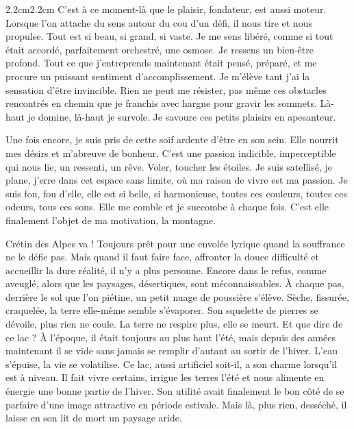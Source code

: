 \begin{adjustwidth}{2.2cm}{2.2cm}
C’est à ce moment-là que le plaisir, fondateur, est aussi moteur. Lorsque l’on attache du sens autour du cou d’un défi, il nous tire et nous propulse. Tout est si beau, si grand, si vaste. Je me sens libéré, comme si tout était accordé, parfaitement orchestré, une osmose. Je ressens un bien-être profond. Tout ce que j’entreprends maintenant était pensé, préparé, et me procure un puissant sentiment d’accomplissement. Je m’élève tant j’ai la sensation d’être invincible. Rien ne peut me résister, pas même ces obstacles rencontrés en chemin que je franchis avec hargne pour gravir les sommets. Là-haut je domine, là-haut je survole. Je savoure ces petits plaisirs en apesanteur.

Une fois encore, je suis pris de cette soif ardente d’être en son sein. Elle nourrit mes désirs et m’abreuve de bonheur. C’est une passion indicible, imperceptible qui nous lie, un ressenti, un rêve. Voler, toucher les étoiles. Je suis satellisé, je plane, j’erre dans cet espace sans limite, où ma raison de vivre est ma passion. Je suis fou, fou d’elle, elle est si belle, si harmonieuse, toutes ces couleurs, toutes ces odeurs, tous ces sons. Elle me comble et je succombe à chaque fois. C’est elle finalement l’objet de ma motivation, la montagne.

Crétin des Alpes va ! Toujours prêt pour une envolée lyrique quand la souffrance ne le défie pas. Mais quand il faut faire face, affronter la douce difficulté et accueillir la dure réalité, il n’y a plus personne. Encore dans le refus, comme aveuglé, alors que les paysages, désertiques, sont méconnaissables. À chaque pas, derrière le sol que l’on piétine, un petit nuage de poussière s’élève. Sèche, fissurée, craquelée, la terre elle-même semble s’évaporer. Son squelette de pierres se dévoile, plus rien ne coule. La terre ne respire plus, elle se meurt. Et que dire de ce lac ? À l’époque, il était toujours au plus haut l’été, mais depuis des années maintenant il se vide sans jamais se remplir d’autant au sortir de l’hiver. L’eau s’épuise, la vie se volatilise. Ce lac, aussi artificiel soit-il, a son charme lorsqu’il est à niveau. Il fait vivre certains, irrigue les terres l’été et nous alimente en énergie une bonne partie de l’hiver. Son utilité avait finalement le bon côté de se parfaire d’une image attractive en période estivale. Mais là, plus rien, desséché, il laisse en son lit de mort un paysage aride. 


\end{adjustwidth}
